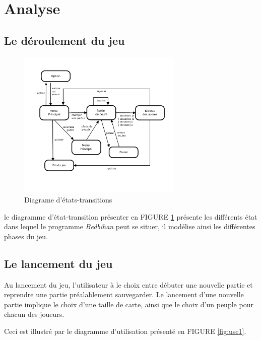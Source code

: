 
\section{Analyse}

	
	\subsection{Le déroulement du jeu}


		\begin{figure}
			\begin{center}
				\includegraphics[width=0.7\textwidth]{figure/etat_transition_partie.pdf}
			\end{center}
			\caption{Diagrame d'états-transitions}
			\label{fig:transition_jeu}
		\end{figure}
	
		le diagramme d'état-transition présenter en FIGURE \ref{fig:transition_jeu} présente les différents état dans lequel le programme \emph{Bedbihan} peut se situer, il modélise ainsi les différentes phases du jeu.


		\subsection{Le lancement du jeu}

		Au lancement du jeu, l'utilisateur à le choix entre débuter une nouvelle partie et reprendre une partie préalablement sauvegarder. Le lancement d'une nouvelle partie implique le choix d'une taille de carte, ainsi que le choix d'un peuple pour chacun des joueurs. 

		Ceci est illustré par le diagramme d'utilisation présenté en FIGURE \ref{fig:use1}.

